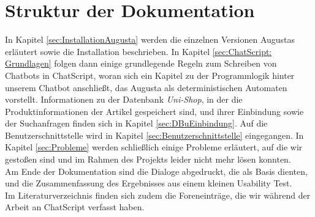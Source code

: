 \section{Struktur der Dokumentation}
\label{sec:Inhaltsbeschreibung} 
In Kapitel \ref{sec:InstallationAugusta} werden die einzelnen Versionen Augustas erläutert sowie die Installation beschrieben. In Kapitel \ref{sec:ChatScript: Grundlagen} folgen dann einige grundlegende Regeln zum Schreiben von Chatbots in ChatScript, woran sich ein Kapitel zu der Programmlogik hinter unserem Chatbot anschließt, das Augusta als deterministischen Automaten vorstellt. Informationen zu der Datenbank \textit{Uni-Shop}, in der die Produktinformationen der Artikel gespeichert sind, und ihrer Einbindung sowie der Suchanfragen finden sich in Kapitel \ref{sec:DBuEinbindung}. Auf die Benutzerschnittstelle wird in Kapitel \ref{sec:Benutzerschnittstelle} eingegangen. In Kapitel \ref{sec:Probleme} werden schließlich einige Probleme erläutert, auf die wir gestoßen sind und im Rahmen des Projekts leider nicht mehr lösen konnten.\\
Am Ende der Dokumentation sind die Dialoge abgedruckt, die als Basis dienten, und die Zusammenfassung des Ergebnisses aus einem kleinen Usability Test.\\
Im Literaturverzeichnis finden sich zudem die Foreneinträge, die wir während der Arbeit an ChatScript verfasst haben.
